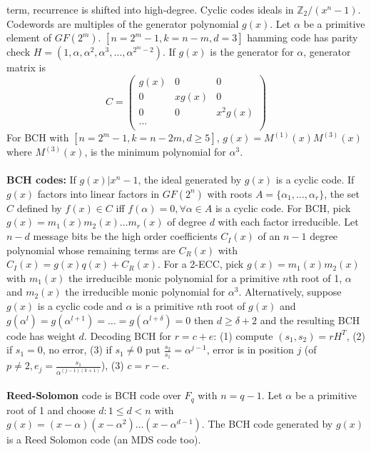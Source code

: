 term, recurrence is shifted into high-degree.
Cyclic codes ideals in ${\mathbb Z}_2 / (x^n - 1)$.  Codewords are multiples
of the generator polynomial $g(x)$. Let $\alpha$ be a primitive element
of $GF(2^m )$.  $[n=2^m -1, k= n-m, d=3]$ hamming code has parity check
$H= (1, \alpha , \alpha^2 , \alpha^3 , \ldots , \alpha^{2^m - 2})$.
If $g(x)$ is the generator for $\alpha$, generator matrix is
$$
C=
\left(
\begin{array}{ccc}
g(x) & 0 & 0\\
0 & xg(x) & 0\\
0 & 0 & x^2 g(x)\\
...\\
\end{array}
\right)
$$
For BCH with $[n=2^m -1, k= n-2m, d\geq 5]$, $g(x)= M^{(1)}(x)M^{(3)}(x)$
where $M^{(3)}(x)$, is the minimum polynomial for $\alpha^3$.
\\
\\
{\bf BCH codes:}
If $g(x) | x^n - 1$, the ideal generated by $g(x)$ is a cyclic code.
If $g(x)$ factors into linear factors in $GF(2^n)$ with roots
$A= \{ \alpha_1 , \ldots , \alpha_r \}$,  the
set $C$ defined by $f(x)  \in
C$ iff $f(\alpha)= 0, \forall \alpha \in A$ is a
cyclic code.  For BCH, pick $g(x)= m_1 (x) m_2 (x) \ldots m_r (x)$ of degree
$d$ with each factor irreducible. Let $n-d$ message bits be the high order
coefficients $C_I (x)$ of an $n-1$ degree polynomial whose remaining terms
are $C_R (x)$ with $C_I (x)= g(x) q(x) + C_R (x)$.  For
a 2-ECC, pick $g(x)=  m_1 (x) m_2 (x)$ with
$m_1 (x)$ the irreducible monic polynomial
for a primitive $n$th root of 1, $\alpha$ and
$m_2 (x)$ the irreducible monic polynomial for $\alpha^3$. Alternatively,
suppose $g(x)$ is a cyclic code and
$\alpha$ is a primitive $n$th root of $g(x)$ and 
$g(\alpha^l)= g(\alpha^{l+1})= \ldots = g(\alpha^{l+\delta})=0$ then
$d \ge \delta+2$ and the resulting BCH code has weight $d$.  Decoding
BCH for $r=c+e$: (1) compute $(s_1 , s_2)= rH^T$, (2) if $s_1=0$, no error,
(3) if $s_1 \ne 0$ put ${\frac {s_2} {s_1}} = \alpha^{j-1}$, error is in
position $j$ (of $p \ne 2, e_j = {\frac {s_1} {\alpha^{(j-1)(k+1)}}}$), 
(3) $c=r-e$.
\\
\\
{\bf Reed-Solomon} code is BCH code over $F_q$ with $n= q-1$. Let $\alpha$ be a
primitive root of 1 and choose $d: 1 \le d < n$ with
$g(x)= (x- \alpha) (x-\alpha^2) \ldots (x- \alpha^{d-1})$.  The BCH code
generated by $g(x)$ is a Reed Solomon code (an MDS code too).
\\
\\
